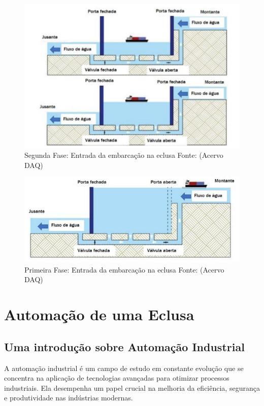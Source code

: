 \begin{figure}[h]
	\centering
	\label{fig:segundafase}
		\includegraphics[keepaspectratio=true,scale=0.6]{figuras/fase02.png}
	\caption{Segunda Fase: Entrada da embarcação na eclusa Fonte: (Acervo DAQ)}
\end{figure}

\begin{figure}[h]
	\centering
	\label{fig:terceira fase}
		\includegraphics[keepaspectratio=true,scale=0.6]{figuras/fase03.png}
	\caption{Primeira Fase: Entrada da embarcação na eclusa Fonte: (Acervo DAQ)}
\end{figure}

\section{Automação de uma Eclusa}

\subsection{Uma introdução sobre Automação Industrial}

A automação industrial é um campo de estudo em constante evolução que se concentra na aplicação de tecnologias avançadas para otimizar processos industriais. Ela desempenha um papel crucial na melhoria da eficiência, segurança e produtividade nas indústrias modernas\cite{Groover}.

